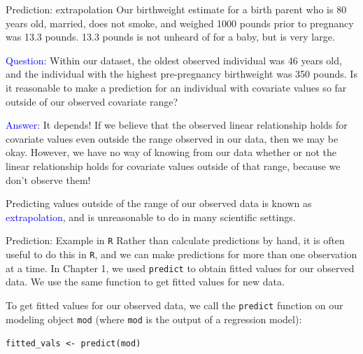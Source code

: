 \documentclass[10pt,t]{beamer}
\begin{document}
\begin{frame}{Prediction: extrapolation}
	\vspace{-0.5cm}
Our birthweight estimate for a birth parent who is 80 years old, married, does not smoke, and weighed 1000 pounds prior to pregnancy was 13.3 pounds. 13.3 pounds is not unheard of for a baby, but is very large.

\vspace{0.3cm}

\textcolor{blue}{Question:} Within our dataset, the oldest observed individual was 46 years old, and the individual with the highest pre-pregnancy birthweight was 350 pounds. Is it reasonable to make a prediction for an individual with covariate values so far outside of our observed covariate range? \pause

\vspace{0.3cm}

\textcolor{blue}{Answer:} It depends! If we believe that the observed linear relationship holds for covariate values even outside the range observed in our data, then we may be okay. However, we have no way of knowing from our data whether or not the linear relationship holds for covariate values outside of that range, because we don't observe them! 

\vspace{0.3cm}

\small Predicting values outside of the range of our observed data is known as \textcolor{blue}{extrapolation}, and is unreasonable to do in many scientific settings.

\end{frame}

\begin{frame}{Prediction: Example in \texttt{R}}
Rather than calculate predictions by hand, it is often useful to do this in \texttt{R}, and we can make predictions for more than one observation at a time. In Chapter 1, we used \texttt{predict} to obtain fitted values for our observed data. We use the same function to get fitted values for new data.

\vspace{0.3cm}

To get fitted values for our observed data, we call the \texttt{predict} function on our modeling object \texttt{mod} (where \texttt{mod} is the output of a regression model):

\vspace{0.3cm}

\texttt{fitted\_vals <- predict(mod)}
\end{frame}
\end{document}

